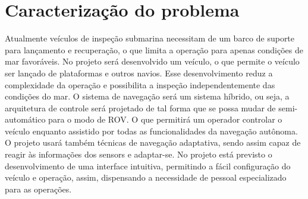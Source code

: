 \chapter{Caracterização do problema}
Atualmente veículos de inspeção submarina necessitam de um barco de suporte para lançamento e recuperação, o que limita a operação para apenas condições de mar favoráveis. No projeto será desenvolvido um veículo, o que permite o veículo ser lançado de plataformas e outros navios. Esse desenvolvimento reduz a complexidade da operação e possibilita a inspeção independentemente das condições do mar. 
O sistema de navegação será um sistema híbrido, ou seja, a arquitetura de controle será projetado de tal forma que se possa mudar de semi-automático para o modo de ROV. O que permitirá um operador controlar o veículo enquanto assistido por todas as funcionalidades da navegação autônoma. O projeto usará também técnicas de navegação adaptativa, sendo assim capaz de reagir às informações dos sensors e adaptar-se.
No projeto está previsto o desenvolvimento de uma interface intuitiva, permitindo a fácil configuração do veículo e operação, assim, dispensando a necessidade de pessoal especializado para as operações. 

